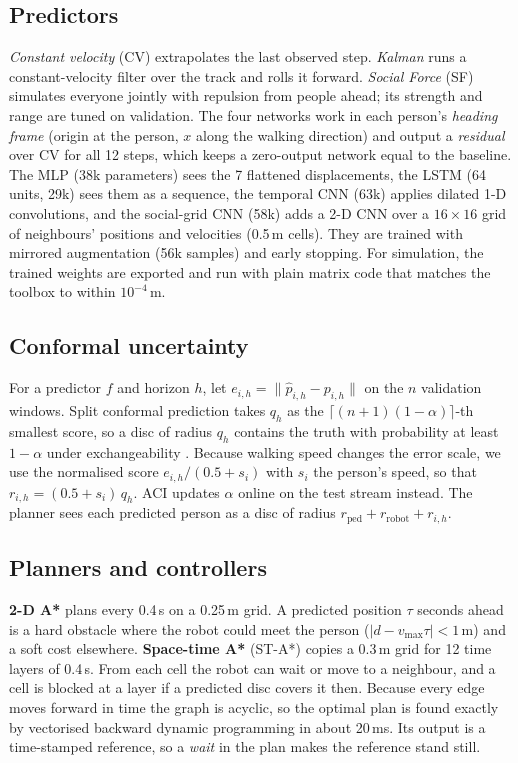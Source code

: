 \subsection{Predictors}
\emph{Constant velocity} (CV) extrapolates the last observed step.
\emph{Kalman} runs a constant-velocity filter \cite{kalman1960} over the
track and rolls it forward. \emph{Social Force} (SF) \cite{helbing1995}
simulates everyone jointly with repulsion from people ahead; its strength
and range are tuned on validation. The four networks work in each
person's \emph{heading frame} (origin at the person, $x$ along the walking
direction) and output a \emph{residual} over CV for all 12 steps, which
keeps a zero-output network equal to the baseline. The MLP (38k
parameters) sees the 7 flattened displacements, the LSTM
\cite{hochreiter1997} (64 units, 29k) sees them as a sequence, the
temporal CNN \cite{bai2018} (63k) applies dilated 1-D convolutions, and the
social-grid CNN (58k) adds a 2-D CNN over a $16\times16$ grid of
neighbours' positions and velocities (0.5\,m cells). They are trained
with mirrored augmentation (56k samples) and early stopping. For
simulation, the trained weights are exported and run with plain matrix
code that matches the toolbox to within $10^{-4}$\,m.

\subsection{Conformal uncertainty}
For a predictor $f$ and horizon $h$, let $e_{i,h}=\|\hat p_{i,h}-p_{i,h}\|$
on the $n$ validation windows. Split conformal prediction takes
$q_h$ as the $\lceil (n+1)(1-\alpha)\rceil$-th smallest score, so a disc
of radius $q_h$ contains the truth with probability at least $1-\alpha$
under exchangeability \cite{vovk2005}. Because walking speed changes the
error scale, we use the normalised score $e_{i,h}/(0.5+s_i)$ with $s_i$ the
person's speed, so that $r_{i,h}=(0.5+s_i)\,q_h$. ACI \cite{gibbs2021}
updates $\alpha$ online on the test stream instead. The planner sees each
predicted person as a disc of radius $r_{\text{ped}}+r_{\text{robot}}+r_{i,h}$.

\subsection{Planners and controllers}
\textbf{2-D A*} \cite{hart1968} plans every 0.4\,s on a 0.25\,m grid. A
predicted position $\tau$ seconds ahead is a hard obstacle where the robot
could meet the person ($|d-v_{\max}\tau|<1$\,m) and a soft cost elsewhere.
\textbf{Space-time A*} (ST-A*) \cite{silver2005} copies a 0.3\,m grid for
12 time layers of 0.4\,s. From each cell the robot can wait or move to a
neighbour, and a cell is blocked at a layer if a predicted disc covers it
then. Because every edge moves forward in time the graph is acyclic, so
the optimal plan is found exactly by vectorised backward dynamic
programming in about 20\,ms. Its output is a time-stamped reference, so a
\emph{wait} in the plan makes the reference stand still.


